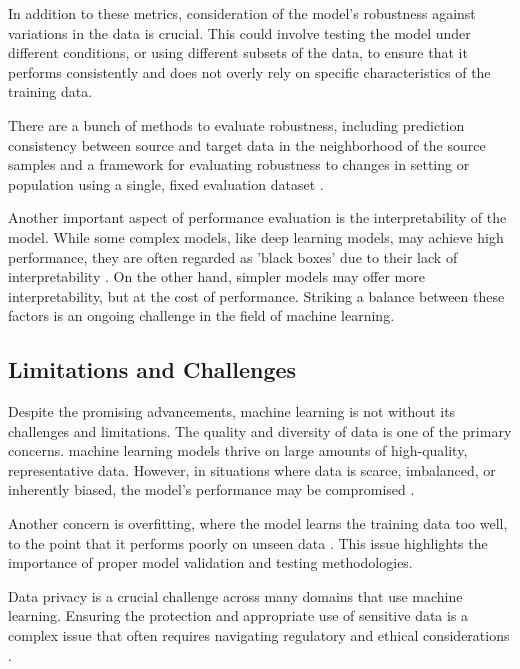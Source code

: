 In addition to these metrics, consideration of the model's robustness against variations in the data is crucial. This could involve testing the model under different conditions, or using different subsets of the data, to ensure that it performs consistently and does not overly rely on specific characteristics of the training data. 

There are a bunch of methods to evaluate robustness, including prediction consistency between source and target data in the neighborhood of the source samples \parencite{Shi2019} and a framework for evaluating robustness to changes in setting or population using a single, fixed evaluation dataset \parencite{Subbaswamy2020EvaluatingMR}.

Another important aspect of performance evaluation is the interpretability of the model. While some complex models, like deep learning models, may achieve high performance, they are often regarded as 'black boxes' due to their lack of interpretability \parencite{Zhang2018}. On the other hand, simpler models may offer more interpretability, but at the cost of performance. Striking a balance between these factors is an ongoing challenge in the field of machine learning.\\

\newpage
\subsection{Limitations and Challenges}
Despite the promising advancements, machine learning is not without its challenges and limitations. The quality and diversity of data is one of the primary concerns. machine learning models thrive on large amounts of high-quality, representative data. However, in situations where data is scarce, imbalanced, or inherently biased, the model's performance may be compromised \parencite{Lum2017}.

Another concern is overfitting, where the model learns the training data too well, to the point that it performs poorly on unseen data \parencite{Ying2019}. This issue highlights the importance of proper model validation and testing methodologies.

Data privacy is a crucial challenge across many domains that use machine learning. Ensuring the protection and appropriate use of sensitive data is a complex issue that often requires navigating regulatory and ethical considerations \parencite{Strobel2022}.\\

\newpage
